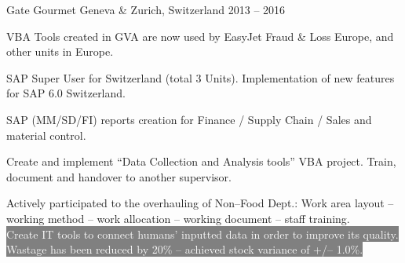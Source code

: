 \begin{cventries}
{Gate Gourmet} %
{Geneva \& Zurich, Switzerland} %
{2013 – 2016} %
{\begin{cvitems}
\item {VBA Tools created in GVA are now used by EasyJet Fraud \& Loss Europe, and other units in Europe.}
\item {SAP Super User for Switzerland (total 3 Units). Implementation of new features for SAP 6.0 Switzerland.}
\item {SAP (MM/SD/FI) reports creation for Finance / Supply Chain / Sales and material control.}
\item {Create and implement “Data Collection and Analysis tools” VBA project. Train, document and handover to another supervisor.}
\item {Actively participated to the overhauling of Non–Food Dept.: Work area layout – working method – work allocation – working document – staff training.}
\\
\center\colorbox{gray}{\textcolor{white}{Create IT tools to connect humans’ inputted data in order to improve its quality.}}
\center\colorbox{gray}{\textcolor{white}{Wastage has been reduced by 20\% – achieved stock variance of +/– 1.0\%.}}
\end{cvitems}
}




\end{cventries}
